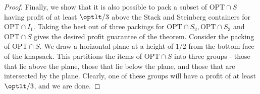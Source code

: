 \begin{proof}
    Finally, we show that it is also possible to pack a subset of $\text{OPT}\cap S$ having profit of at least $\optlt/3$ above the Stack and Steinberg containers for $\text{OPT}\cap I_1$. Taking the best out of three packings for $\text{OPT}\cap S_2, \text{OPT}\cap S_3$ and $\text{OPT}\cap S$ gives the desired profit guarantee of the theorem.  Consider the packing of $\text{OPT}\cap S$. We draw a horizontal plane at a height of $1/2$ from the bottom face of the knapsack. This partitions the items of $\text{OPT}\cap S$ into three groups - those that lie above the plane, those that lie below the plane, and those that are intersected by the plane. Clearly, one of these groups will have a profit of at least $\optlt/3$, and we are done.
\end{proof}




















